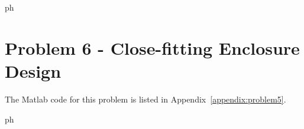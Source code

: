 {{\vspace{0.25cm}
ph







\newpage
\section*{Problem 6 - Close-fitting Enclosure Design}

The Matlab code for this problem is listed in Appendix~\ref{appendix:problem5}.

\vspace{0.25cm}
ph






%
%



%
%



%
%



%
%



}}

